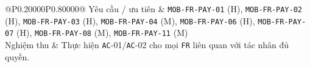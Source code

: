 \begin{longtable}{@{}P{0.20000\SRSWidth}P{0.80000\SRSWidth}@{}}
Yêu cầu /\allowbreak{} ưu tiên & \texttt{MOB-\allowbreak{}FR-\allowbreak{}PAY-\allowbreak{}01} (H), \texttt{MOB-\allowbreak{}FR-\allowbreak{}PAY-\allowbreak{}02} (H), \texttt{MOB-\allowbreak{}FR-\allowbreak{}PAY-\allowbreak{}03} (H), \texttt{MOB-\allowbreak{}FR-\allowbreak{}PAY-\allowbreak{}04} (M), \texttt{MOB-\allowbreak{}FR-\allowbreak{}PAY-\allowbreak{}06} (H), \texttt{MOB-\allowbreak{}FR-\allowbreak{}PAY-\allowbreak{}07} (H), \texttt{MOB-\allowbreak{}FR-\allowbreak{}PAY-\allowbreak{}08} (M), \texttt{MOB-\allowbreak{}FR-\allowbreak{}PAY-\allowbreak{}11} (M) \\[3pt]
Nghiệm thu & Thực hiện \texttt{AC}-01/\allowbreak{}\texttt{AC}-02 cho mọi \texttt{FR} liên quan với tác nhân đủ quyền. \\[3pt]
\end{longtable}
\endgroup

